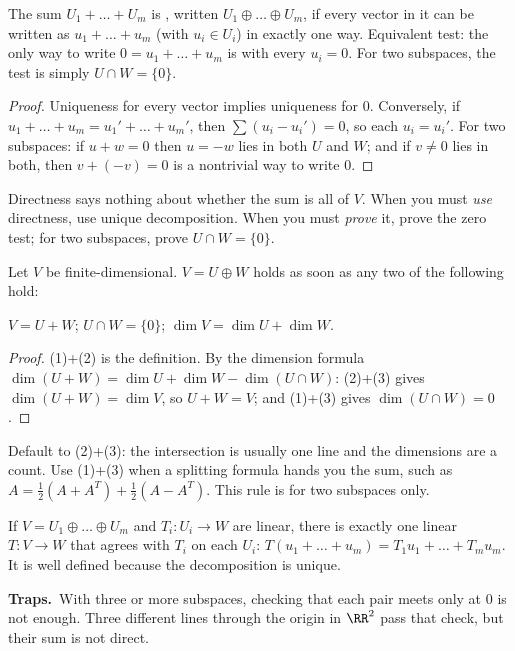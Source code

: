 \documentclass[11pt]{scrartcl}
\newcommand{\traps}{\par\medskip\noindent\textbf{\color{RawSienna}Traps.}\ }
\begin{document}
\begin{proposition*}
  The sum $U_1+\dots+U_m$ is , written $U_1\oplus\dots\oplus U_m$, if every vector in it can be written as $u_1+\dots+u_m$ (with $u_i\in U_i$) in exactly one way.
  Equivalent test: the only way to write $0=u_1+\dots+u_m$ is with every $u_i=0$.
  For two subspaces, the test is simply $U\cap W=\{0\}$.
\end{proposition*}
\begin{proof}
  Uniqueness for every vector implies uniqueness for $0$. Conversely, if $u_1+\dots+u_m=u_1'+\dots+u_m'$, then $\sum(u_i-u_i')=0$, so each $u_i=u_i'$.
  For two subspaces: if $u+w=0$ then $u=-w$ lies in both $U$ and $W$; and if $v\ne0$ lies in both, then $v+(-v)=0$ is a nontrivial way to write $0$.
\end{proof}
Directness says nothing about whether the sum is all of $V$. When you must \emph{use} directness, use unique decomposition. When you must \emph{prove} it, prove the zero test; for two subspaces, prove $U\cap W=\{0\}$.

\begin{proposition*}[Proving $V=U\oplus W$: two of three]
  Let $V$ be finite-dimensional. $V=U\oplus W$ holds as soon as any two of the following hold:
  \begin{enumerate}
    \ii $V=U+W$;
    \ii $U\cap W=\{0\}$;
    \ii $\dim V=\dim U+\dim W$.
  \end{enumerate}
\end{proposition*}
\begin{proof}
  (1)+(2) is the definition. By the dimension formula $\dim(U+W)=\dim U+\dim W-\dim(U\cap W)$: (2)+(3) gives $\dim(U+W)=\dim V$, so $U+W=V$; and (1)+(3) gives $\dim(U\cap W)=0$.
\end{proof}
Default to (2)+(3): the intersection is usually one line and the dimensions are a count. Use (1)+(3) when a splitting formula hands you the sum, such as $A=\tfrac12(A+A^T)+\tfrac12(A-A^T)$. This rule is for two subspaces only.

\begin{proposition*}
  If $V=U_1\oplus\dots\oplus U_m$ and $T_i\colon U_i\to W$ are linear, there is exactly one linear $T\colon V\to W$ that agrees with $T_i$ on each $U_i$: $T(u_1+\dots+u_m)=T_1u_1+\dots+T_mu_m$.
  It is well defined because the decomposition is unique.
\end{proposition*}

\traps With three or more subspaces, checking that each pair meets only at $0$ is not enough. Three different lines through the origin in $\RR^2$ pass that check, but their sum is not direct.
\end{document}

